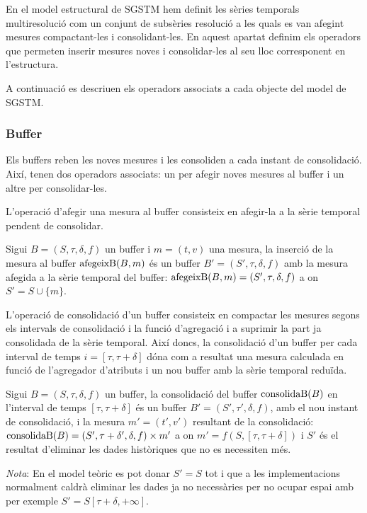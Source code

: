 En el model estructural de SGSTM hem definit les sèries temporals
multiresolució com un conjunt de subsèries resolució a les quals es
van afegint mesures compactant-les i consolidant-les. En aquest
apartat definim els operadors que permeten inserir mesures noves i
consolidar-les al seu lloc corresponent en l'estructura.

A continuació es descriuen els operadors associats a cada objecte del
model de SGSTM.


\subsubsection{Buffer}

Els buffers reben les noves mesures i les consoliden a cada instant de
consolidació. Així, tenen dos operadors associats: un per afegir noves
mesures al buffer i un altre per consolidar-les.


L'operació d'afegir una mesura al buffer consisteix en afegir-la a la
sèrie temporal pendent de consolidar.
\begin{definition}
  Sigui $B=(S,\tau,\delta,f)$ un buffer i $m=(t,v)$ una mesura, la
  inserció de la mesura al buffer $\operatorname*{afegeixB}(B,m)$ és un buffer
  $B'=(S',\tau,\delta,f)$ amb la mesura afegida a la sèrie temporal
  del buffer: $\operatorname*{afegeixB}(B,m) = (S',\tau,\delta,f)$ a on $S'=S\cup \{m\}$.
\end{definition}


L'operació de consolidació d'un buffer consisteix en compactar les
mesures segons els intervals de consolidació i la funció d'agregació i
a suprimir la part ja consolidada de la sèrie temporal.  Així doncs,
la consolidació d'un buffer per cada interval de temps
$i=[\tau,\tau+\delta]$ dóna com a resultat una mesura calculada en
funció de l'agregador d'atributs i un nou buffer amb la sèrie temporal
reduïda.
\begin{definition}
  Sigui $B=(S,\tau,\delta,f)$ un buffer, la consolidació del buffer
  $\operatorname*{consolidaB}(B)$ en l'interval de temps $[\tau,\tau+\delta]$ és un
  buffer $B'=(S',\tau',\delta,f)$, amb el nou instant de consolidació,
  i la mesura $m'=(t',v')$ resultant de la consolidació: $\operatorname*{consolidaB}(B) =
  (S',\tau+\delta',\delta,f) \times m'$ a on
  $m'=f(S,[\tau,\tau+\delta])$ i $S'$ és el resultat d'eliminar les
  dades històriques que no es necessiten més. 

  \emph{Nota}: En el model teòric es pot donar $S'=S$ tot i que a les
  implementacions normalment caldrà eliminar les dades ja no
  necessàries per no ocupar espai amb per exemple $S'=
  S[\tau+\delta,+\infty]$.
\end{definition}

